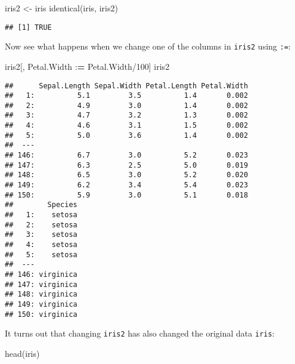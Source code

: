 \documentclass[
]{book}
\newenvironment{Shaded}{\begin{snugshade}}{\end{snugshade}}
\newcommand{\DecValTok}[1]{\textcolor[rgb]{0.00,0.00,0.81}{#1}}
\newcommand{\ErrorTok}[1]{\textcolor[rgb]{0.64,0.00,0.00}{\textbf{#1}}}
\newcommand{\FunctionTok}[1]{\textcolor[rgb]{0.00,0.00,0.00}{#1}}
\newcommand{\NormalTok}[1]{#1}
\newcommand{\OtherTok}[1]{\textcolor[rgb]{0.56,0.35,0.01}{#1}}
\newcommand{\SpecialCharTok}[1]{\textcolor[rgb]{0.00,0.00,0.00}{#1}}
\begin{document}
\begin{Shaded}
\begin{Highlighting}[]
\NormalTok{iris2 }\OtherTok{\textless{}{-}}\NormalTok{ iris}
\FunctionTok{identical}\NormalTok{(iris, iris2)}
\end{Highlighting}
\end{Shaded}

\begin{verbatim}
## [1] TRUE
\end{verbatim}

Now see what happens when we change one of the columns in \texttt{iris2} using \texttt{:=}:

\begin{Shaded}
\begin{Highlighting}[]
\NormalTok{iris2[, Petal.Width }\SpecialCharTok{:}\ErrorTok{=}\NormalTok{ Petal.Width}\SpecialCharTok{/}\DecValTok{100}\NormalTok{]}
\NormalTok{iris2}
\end{Highlighting}
\end{Shaded}

\begin{verbatim}
##      Sepal.Length Sepal.Width Petal.Length Petal.Width
##   1:          5.1         3.5          1.4       0.002
##   2:          4.9         3.0          1.4       0.002
##   3:          4.7         3.2          1.3       0.002
##   4:          4.6         3.1          1.5       0.002
##   5:          5.0         3.6          1.4       0.002
##  ---                                                  
## 146:          6.7         3.0          5.2       0.023
## 147:          6.3         2.5          5.0       0.019
## 148:          6.5         3.0          5.2       0.020
## 149:          6.2         3.4          5.4       0.023
## 150:          5.9         3.0          5.1       0.018
##        Species
##   1:    setosa
##   2:    setosa
##   3:    setosa
##   4:    setosa
##   5:    setosa
##  ---          
## 146: virginica
## 147: virginica
## 148: virginica
## 149: virginica
## 150: virginica
\end{verbatim}

It turns out that changing \texttt{iris2} has also changed the original data \texttt{iris}:

\begin{Shaded}
\begin{Highlighting}[]
\FunctionTok{head}\NormalTok{(iris)}
\end{Highlighting}
\end{Shaded}
\end{document}

